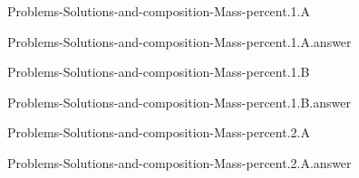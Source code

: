\documentclass[main.tex]{subfiles}
\newcommand\chapterlabel{}
\begin{document}
\renewcommand\chapterlabel{Ch-electrolytes}
\begin{question}[ID=\the\value{numA}]
{Problems-Solutions-and-composition-Mass-percent.1.A}
\end{question}
   \begin{Form}
   \TextField[multiline,backgroundcolor=gray!20,borderwidth=0,width=0.43\textwidth  ,height=115pt, name=\the\value{numA}]  { }\end{Form}
\begin{solution}
{Problems-Solutions-and-composition-Mass-percent.1.A.answer}
\hspace{0.1cm}
\end{solution}


\renewcommand\chapterlabel{Ch-electrolytes}
\begin{question}[ID=\the\value{numA}]
{Problems-Solutions-and-composition-Mass-percent.1.B}
\end{question}
   \begin{Form}
   \TextField[multiline,backgroundcolor=gray!20,borderwidth=0,width=0.43\textwidth  ,height=115pt, name=\the\value{numA}]  { }\end{Form}
\begin{solution}
{Problems-Solutions-and-composition-Mass-percent.1.B.answer}
\hspace{0.1cm}
\end{solution}


\renewcommand\chapterlabel{Ch-electrolytes}
\begin{question}[ID=\the\value{numA}]
{Problems-Solutions-and-composition-Mass-percent.2.A}
\end{question}
   \begin{Form}
   \TextField[multiline,backgroundcolor=gray!20,borderwidth=0,width=0.43\textwidth  ,height=115pt, name=\the\value{numA}]  { }\end{Form}
\begin{solution}
{Problems-Solutions-and-composition-Mass-percent.2.A.answer}
\hspace{0.1cm}
\end{solution}
\end{document}
